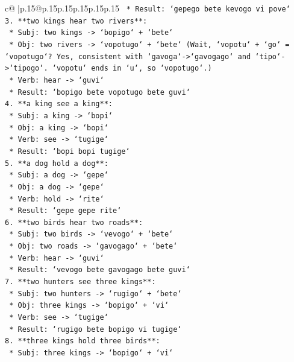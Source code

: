 \documentclass{article}
\begin{document}
{\begin{supertabular}{c@{$\;$}|p{.15\linewidth}@{}p{.15\linewidth}p{.15\linewidth}p{.15\linewidth}p{.15\linewidth}p{.15\linewidth}}
{{{\texttt{    *   Result: `gepego bete kevogo vi pove`} \\
\texttt{3.  **two kings hear two rivers**:} \\
\texttt{    *   Subj: two kings {-}> `bopigo` + `bete`} \\
\texttt{    *   Obj: two rivers {-}> `vopotugo` + `bete` (Wait, `vopotu` + `go` = `vopotugo`? Yes, consistent with `gavoga`{-}>`gavogago` and `tipo`{-}>`tipogo`. `vopotu` ends in `u`, so `vopotugo`.)} \\
\texttt{    *   Verb: hear {-}> `guvi`} \\
\texttt{    *   Result: `bopigo bete vopotugo bete guvi`} \\
\texttt{4.  **a king see a king**:} \\
\texttt{    *   Subj: a king {-}> `bopi`} \\
\texttt{    *   Obj: a king {-}> `bopi`} \\
\texttt{    *   Verb: see {-}> `tugige`} \\
\texttt{    *   Result: `bopi bopi tugige`} \\
\texttt{5.  **a dog hold a dog**:} \\
\texttt{    *   Subj: a dog {-}> `gepe`} \\
\texttt{    *   Obj: a dog {-}> `gepe`} \\
\texttt{    *   Verb: hold {-}> `rite`} \\
\texttt{    *   Result: `gepe gepe rite`} \\
\texttt{6.  **two birds hear two roads**:} \\
\texttt{    *   Subj: two birds {-}> `vevogo` + `bete`} \\
\texttt{    *   Obj: two roads {-}> `gavogago` + `bete`} \\
\texttt{    *   Verb: hear {-}> `guvi`} \\
\texttt{    *   Result: `vevogo bete gavogago bete guvi`} \\
\texttt{7.  **two hunters see three kings**:} \\
\texttt{    *   Subj: two hunters {-}> `rugigo` + `bete`} \\
\texttt{    *   Obj: three kings {-}> `bopigo` + `vi`} \\
\texttt{    *   Verb: see {-}> `tugige`} \\
\texttt{    *   Result: `rugigo bete bopigo vi tugige`} \\
\texttt{8.  **three kings hold three birds**:} \\
\texttt{    *   Subj: three kings {-}> `bopigo` + `vi`} \\
}}}
\end{supertabular}}
\end{document}
